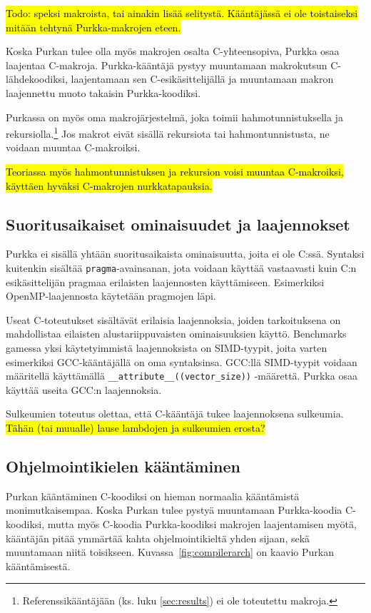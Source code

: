 \hl{Todo: speksi makroista, tai ainakin lisää selitystä. Kääntäjässä ei ole
toistaiseksi mitään tehtynä Purkka-makrojen eteen.}

Koska Purkan tulee olla myös makrojen osalta C-yhteensopiva, Purkka osaa
laajentaa C-makroja. Purkka-kääntäjä pystyy muuntamaan makrokutsun
C-lähdekoodiksi, laajentamaan sen C-esikäsittelijällä ja muuntamaan makron
laajennettu muoto takaisin Purkka-koodiksi.

Purkassa on myös oma makrojärjestelmä, joka toimii hahmotunnistuksella ja
rekursiolla.\footnote{Referenssikääntäjään (ks. luku \ref{sec:results}) ei ole
toteutettu makroja.} Jos makrot eivät sisällä rekursiota tai hahmontunnistusta,
ne voidaan muuntaa C-makroiksi.

\hl{Teoriassa myös hahmontunnistuksen ja rekursion voisi muuntaa C-makroiksi,
käyttäen hyväksi C-makrojen nurkkatapauksia.}

\subsection{Suoritusaikaiset ominaisuudet ja laajennokset}

Purkka ei sisällä yhtään suoritusaikaista ominaisuutta, joita ei ole C:ssä.
Syntaksi kuitenkin sisältää \texttt{pragma}-avainsanan, jota voidaan käyttää
vastaavasti kuin C:n esikäsittelijän pragmaa erilaisten laajennosten
käyttämiseen. Esimerkiksi OpenMP-laajennosta käytetään pragmojen läpi.

Useat C-toteutukset sisältävät erilaisia laajennoksia, joiden tarkoituksena on
mahdollistaa eilaisten alustariippuvaisten ominaisuuksien käyttö. Benchmarks
gamessa yksi käytetyimmistä laajennoksista on SIMD-tyypit, joita varten
esimerkiksi GCC-kääntäjällä on oma syntaksinsa. GCC:llä SIMD-tyypit voidaan
määritellä käyttämällä \texttt{\_\_attribute\_\_((vector\_size))} -määrettä.
Purkka osaa käyttää useita GCC:n laajennoksia.

Sulkeumien toteutus olettaa, että C-kääntäjä tukee laajennoksena sulkeumia.
\hl{Tähän (tai muualle) lause lambdojen ja sulkeumien erosta?}

\subsection{Ohjelmointikielen kääntäminen}

Purkan kääntäminen C-koodiksi on hieman normaalia kääntämistä monimutkaisempaa.
Koska Purkan tulee pystyä muuntamaan Purkka-koodia C-koodiksi, mutta myös
C-koodia Purkka-koodiksi makrojen laajentamisen myötä, kääntäjän pitää ymmärtää
kahta ohjelmointikieltä yhden sijaan, sekä muuntamaan niitä toisikseen.
Kuvassa~\ref{fig:compilerarch} on kaavio Purkan kääntämisestä.

